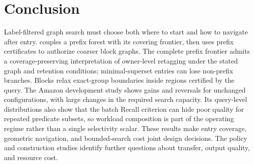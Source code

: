 \section{Conclusion}
Label-filtered graph search must choose both where to start and how to
navigate after entry. \system{} couples a prefix forest with its covering
frontier, then uses prefix certificates to authorize coarser block graphs.
The complete prefix frontier admits a coverage-preserving interpretation of
owner-level retagging under the stated graph and retention conditions;
minimal-superset entries can lose non-prefix branches. Blocks relax
exact-group boundaries inside regions certified by the query.
The Amazon development study shows gains and reversals for unchanged
configurations, with large changes in the required search capacity.
Its query-level distributions also show that the batch Recall criterion can
hide poor quality for repeated predicate subsets, so workload composition is
part of the operating regime rather than a single selectivity scalar.
These results make entry coverage, geometric navigation, and bounded-search
cost joint design decisions. The policy and construction studies identify
further questions about transfer, output quality, and resource cost.
